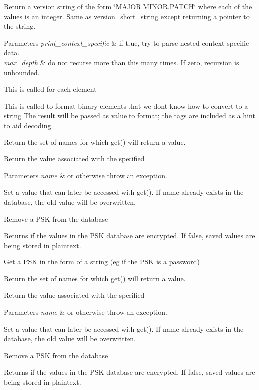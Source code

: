 Return a version string of the form \char`\"{}\+M\+A\+J\+O\+R.\+M\+I\+N\+O\+R.\+P\+A\+T\+C\+H\char`\"{} where each of the values is an integer. Same as version\+\_\+short\+\_\+string except returning a pointer to the string. 
\begin{DoxyParams}{Parameters}
{\em print\+\_\+context\+\_\+specific} & if true, try to parse nested context specific data. \\
\hline
{\em max\+\_\+depth} & do not recurse more than this many times. If zero, recursion is unbounded.\\
\hline
\end{DoxyParams}
This is called for each element

This is called to format binary elements that we don\textquotesingle{}t know how to convert to a string The result will be passed as value to format; the tags are included as a hint to aid decoding.

Return the set of names for which get() will return a value.

Return the value associated with the specified
\begin{DoxyParams}{Parameters}
{\em name} & or otherwise throw an exception.\\
\hline
\end{DoxyParams}
Set a value that can later be accessed with get(). If name already exists in the database, the old value will be overwritten.

Remove a P\+SK from the database

Returns if the values in the P\+SK database are encrypted. If false, saved values are being stored in plaintext.

Get a P\+SK in the form of a string (eg if the P\+SK is a password)

Return the set of names for which get() will return a value.

Return the value associated with the specified
\begin{DoxyParams}{Parameters}
{\em name} & or otherwise throw an exception.\\
\hline
\end{DoxyParams}
Set a value that can later be accessed with get(). If name already exists in the database, the old value will be overwritten.

Remove a P\+SK from the database

Returns if the values in the P\+SK database are encrypted. If false, saved values are being stored in plaintext.

